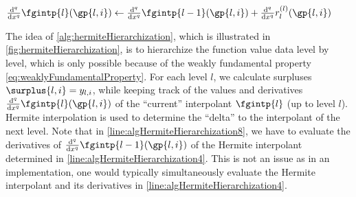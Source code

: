 \begin{algorithm}
\begin{algorithmic}[1]
{              %
              $\frac{\diff^q}{\dx^q} \fgintp{l}(\gp{l,i})
              \gets \frac{\diff^q}{\dx^q} \fgintp{l-1}(\gp{l,i}) +
              \frac{\diff^q}{\dx^q} r^{(l)}_l(\gp{l,i})$%
            }
            \label{line:algHermiteHierarchization8}
          \EndFor{}
        \EndFor{}
      \EndFor{}
    \EndFunction{}
  \end{algorithmic}
  \caption[%
    Hermite hierarchization%
  ]{%
    Hermite hierarchization on one-dimensional regular grids.
    Inputs are
    the vector $\vlinin = (\linin{l,i})_{(l,i) \in \liset}$
    of input data (function values $\fcnval{l,i}$ at the grid points) and
    the level $n$ of the regular grid,
    where $\liset = \{(l, i) \mid l = 0, \dotsc, n,\; i \in \hiset{l}\}$.
    The output is the vector
    $\vlinout = (\linout{l,i})_{(l,i) \in \liset}$
    of output data (hierarchical surpluses $\surplus{l,i}$).%
  }%
  \label{alg:hermiteHierarchization}%
\end{algorithm}

The idea of \cref{alg:hermiteHierarchization},
which is illustrated in \cref{fig:hermiteHierarchization},
is to hierarchize the function value data level by level,
which is only possible because of the weakly fundamental property
\eqref{eq:weaklyFundamentalProperty}.
For each level $l$, we calculate surpluses
$\surplus{l,i} = \linout{l,i}$, while keeping track of
the values and derivatives
$\frac{\diff^q}{\dx^q} \fgintp{l}(\gp{l,i})$ of the
``current'' interpolant $\fgintp{l}$ (up to level $l$).
Hermite interpolation is used to determine the ``delta''
to the interpolant of the next level.
Note that in \cref{line:algHermiteHierarchization8},
we have to evaluate the derivatives of
$\frac{\diff^q}{\dx^q} \fgintp{l-1}(\gp{l,i})$ of the Hermite interpolant
determined in \cref{line:algHermiteHierarchization4}.
This is not an issue as in an implementation,
one would typically simultaneously evaluate the
Hermite interpolant and its derivatives in
\cref{line:algHermiteHierarchization4}.

